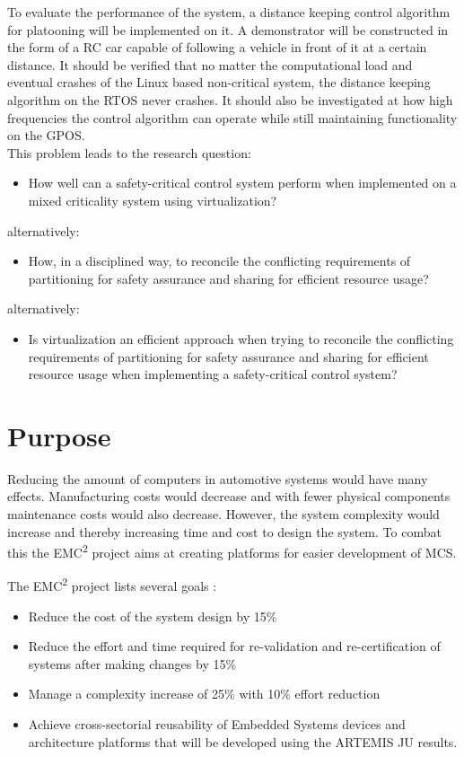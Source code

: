 To evaluate the performance of the system, a distance keeping control algorithm for platooning will be implemented on it. A demonstrator will be constructed in the form of a RC car capable of following a vehicle in front of it at a certain distance. It should be verified that no matter the computational load and eventual crashes of the Linux based non-critical system, the distance keeping algorithm on the RTOS never crashes. It should also be investigated at how high frequencies the control algorithm can operate while still maintaining functionality on the GPOS. \\

This problem leads to the research question: 
\begin{itemize}
\item How well can a safety-critical control system perform when implemented on a mixed criticality system using virtualization?
\end{itemize}
alternatively:
\begin{itemize}
\item How, in a disciplined way, to reconcile the conflicting requirements of partitioning for safety assurance and sharing for efficient resource usage? \cite{burns2016}
\end{itemize}
alternatively:
\begin{itemize}
\item Is virtualization an efficient approach when trying to reconcile the conflicting requirements of partitioning for safety assurance and sharing for efficient resource usage when implementing a safety-critical control system?
\end{itemize}

\section{Purpose}
Reducing the amount of computers in automotive systems would have many effects. Manufacturing costs would decrease and with fewer physical components maintenance costs would also decrease. However, the system complexity would increase and thereby increasing time and cost to design the system. To combat this the EMC\textsuperscript{2} project aims at creating platforms for easier development of MCS. %

The EMC\textsuperscript{2} project lists several goals \cite{website:emc2goals}:
\begin{itemize}
\item Reduce the cost of the system design by 15\%
\item Reduce the effort and time required for re-validation and re-certification of systems after making changes by 15\%
\item Manage a complexity increase of 25\% with 10\% effort reduction
\item Achieve cross-sectorial reusability of Embedded Systems devices and architecture platforms that will be developed using the ARTEMIS JU results.
\end{itemize}

